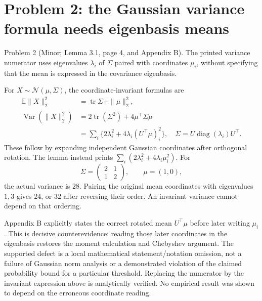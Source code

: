 \documentclass[10pt]{article}
\begin{document}
\section*{Problem 2: the Gaussian variance formula needs eigenbasis means}
Problem 2 (Minor; Lemma 3.1, page 4, and Appendix B).  The printed variance numerator uses eigenvalues \(\lambda_i\) of \(\Sigma\) paired with coordinates \(\mu_i\), without specifying that the mean is expressed in the covariance eigenbasis.\par
For \(X\sim\mathcal N(\mu,\Sigma)\), the coordinate-invariant formulas are \[\begin{aligned}
 \mathbb E\|X\|_2^2&=\operatorname{tr}\Sigma+\|\mu\|_2^2,\\
 \operatorname{Var}(\|X\|_2^2)
 &=2\operatorname{tr}(\Sigma^2)+4\mu^\top\Sigma\mu\\
 &=\sum_i\{2\lambda_i^2+4\lambda_i(U^\top\mu)_i^2\},
 \quad \Sigma=U\operatorname{diag}(\lambda_i)U^\top .\end{aligned}\] These follow by expanding independent Gaussian coordinates after orthogonal rotation. The lemma instead prints \(\sum_i(2\lambda_i^2+4\lambda_i\mu_i^2)\). For \[\Sigma=\begin{pmatrix}2&1\\1&2\end{pmatrix},\qquad \mu=(1,0),\] the actual variance is \(28\). Pairing the original mean coordinates with eigenvalues \(1,3\) gives \(24\), or \(32\) after reversing their order. An invariant variance cannot depend on that ordering.\par
Appendix B explicitly states the correct rotated mean \(U^\top\mu\) before later writing \(\mu_i\). This is decisive counterevidence: reading those later coordinates in the eigenbasis restores the moment calculation and Chebyshev argument. The supported defect is a local mathematical statement/notation omission, not a failure of Gaussian norm analysis or a demonstrated violation of the claimed probability bound for a particular threshold. Replacing the numerator by the invariant expression above is analytically verified. No empirical result was shown to depend on the erroneous coordinate reading.\par
\end{document}
